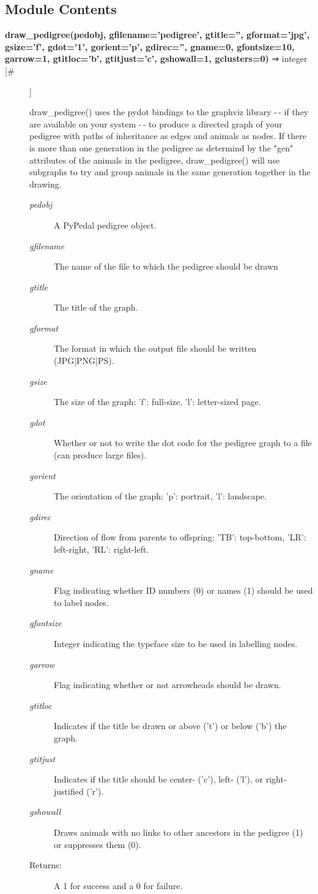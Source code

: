 \documentclass{article}
\begin{document}
\subsection*{Module Contents}
\begin{description}
\item[\textbf{draw\_pedigree(pedobj, gfilename='pedigree', gtitle='', gformat='jpg', gsize='f', gdot='1', gorient='p', gdirec='', gname=0, gfontsize=10, garrow=1, gtitloc='b', gtitjust='c', gshowall=1, gclusters=0)} ⇒ integer [\#]
]
\par draw\_pedigree() uses the pydot bindings to the graphviz library -$\,$- if they
are available on your system -$\,$- to produce a directed graph of your pedigree
with paths of inheritance as edges and animals as nodes.  If there is more than
one generation in the pedigree as determind by the "gen" attributes of the animals
in the pedigree, draw\_pedigree() will use subgraphs to try and group animals in the
same generation together in the drawing.
\begin{description}
\item[\textit{pedobj}
]
A PyPedal pedigree object.
\item[\textit{gfilename}
]
The name of the file to which the pedigree should be drawn
\item[\textit{gtitle}
]
The title of the graph.
\item[\textit{gformat}
]
The format in which the output file should be written  (JPG|PNG|PS).
\item[\textit{gsize}
]
The size of the graph: 'f': full-size, 'l': letter-sized page.
\item[\textit{gdot}
]
Whether or not to write the dot code for the pedigree graph to a file (can produce large files).
\item[\textit{gorient}
]
The orientation of the graph: 'p': portrait, 'l': landscape.
\item[\textit{gdirec}
]
Direction of flow from parents to offspring: 'TB': top-bottom, 'LR': left-right, 'RL': right-left.
\item[\textit{gname}
]
Flag indicating whether ID numbers (0) or names (1) should be used to label nodes.
\item[\textit{gfontsize}
]
Integer indicating the typeface size to be used in labelling nodes.
\item[\textit{garrow}
]
Flag indicating whether or not arrowheads should be drawn.
\item[\textit{gtitloc}
]
Indicates if the title be drawn or above ('t') or below ('b') the graph.
\item[\textit{gtitjust}
]
Indicates if the title should be center- ('c'), left- ('l'), or right-justified ('r').
\item[\textit{gshowall}
]
Draws animals with no links to other ancestors in the pedigree (1) or suppresses them (0).
\item[Returns:
]
A 1 for success and a 0 for failure.
\end{description}\\


\end{description}
\end{document}
